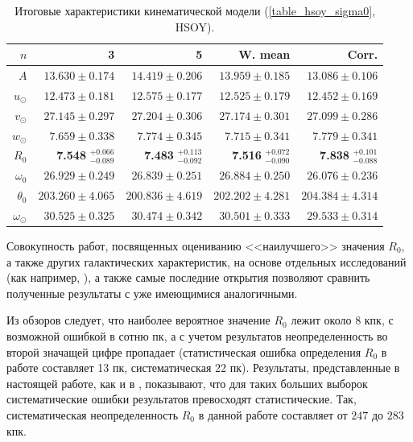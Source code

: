\documentclass{matmex-diploma-custom}
\begin{document}
\begin{table}[h!!] 
\centering
\caption{Итоговые характеристики кинематической модели (\ref{table_hsoy_sigma0}, HSOY).}
\begin{tabular}{r||r|r||r|r}
        $ n$ & 3 & 5 & W. mean & \textrm{Corr.}\\
\hline
\hline
$A $& $13.630  \pm 0.174 $ &   $ 14.419 \pm 0.206 $& $ 13.959 \pm 0.185 $& $13.086 \pm 0.106$ \\ %
$u_{\odot} $& $12.473 \pm 0.181  $  & $ 12.575 \pm 0.177 $& $12.525 \pm 0.179  $& $ 12.452 \pm 0.169$\\
$v_{\odot} $& $27.145 \pm 0.297  $  & $ 27.204 \pm 0.306$& $27.174  \pm 0.301 $& $27.099 \pm 0.286$\\
$w_{\odot} $& $7.659  \pm 0.338 $  &  $7.774 \pm 0.345$ & $7.715 \pm 0.341$ & $7.779 \pm 0.341$\\
\hline
$R_0 $& \textbf{7.548} $^{+0.066}_{-0.089} $   &  \textbf{7.483} $^{+0.113}_{-0.092} $  & \textbf{7.516} $^{+0.072}_{-0.090} $   & \textbf{7.838} $^{+0.101}_{-0.088}$ \\
$\omega_0 $& $26.929  \pm 0.249 $   &  $26.839 \pm 0.251$ & $26.884 \pm 0.250 $ & $26.076 \pm 0.236$\\
$\theta_0 $& $203.260  \pm 4.065    $&  $200.836 \pm 4.619 $& $202.202 \pm 4.281 $ & $ 204.384 \pm 4.314$ \\
\hline
$\omega_{\odot} $& $30.525  \pm 0.325  $  &  $30.474 \pm 0.342 $& $30.501 \pm 0.333 $ & $29.533 \pm 0.314$ \\
\end{tabular}
\end{table}
Совокупность работ, посвященных оцениванию <<наилучшего>> значения $R_0$, а также других галактических характеристик, на основе отдельных исследований (как например, \cite{NIId,Malkin,Camarillo}), а также самые последние \cite{Gravity} открытия позволяют сравнить полученные результаты с уже имеющимися аналогичными. 
\par Из обзоров следует, что наиболее вероятное значение $R_0$ лежит около $8$ кпк, с возможной ошибкой в сотню пк, а с учетом результатов \cite{Gravity} неопределенность во второй значащей цифре пропадает (статистическая ошибка определения $R_0$ в работе \cite{Gravity} составляет 13 пк, систематическая 22 пк). Результаты, представленные в настоящей работе, как и в \cite{Gravity}, показывают, что для таких больших выборок систематические ошибки результатов превосходят статистические. Так, систематическая неопределенность $R_0$ в данной работе составляет от $247$ до $283$ кпк. 
\end{document}
